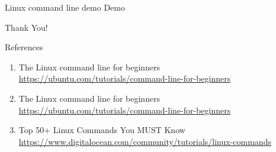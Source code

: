 \documentclass{beamer}
\begin{document}
\begin{frame}{Linux command line demo}
  Demo
\end{frame}

\begin{frame}
    \centering
    \Huge{Thank You!}
\end{frame}

\begin{frame}{References}
  \begin{enumerate}
    \item The Linux command line for beginners \href{https://ubuntu.com/tutorials/command-line-for-beginners}{https://ubuntu.com/tutorials/command-line-for-beginners}
    \item The Linux command line for beginners \href{https://ubuntu.com/tutorials/command-line-for-beginners}{https://ubuntu.com/tutorials/command-line-for-beginners}
    \item Top 50+ Linux Commands You MUST Know \href{https://www.digitalocean.com/community/tutorials/linux-commands}{https://www.digitalocean.com/community/tutorials/linux-commands}
  \end{enumerate}
\end{frame}
\end{document}
